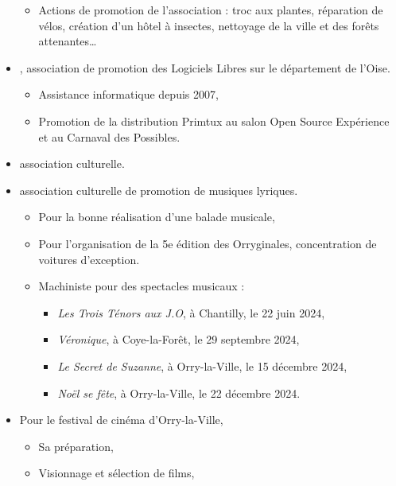 \begin{itemize}
\begin{itemize}
            \item{Actions de promotion de l'association : troc aux plantes, réparation de vélos, création d'un hôtel à insectes, nettoyage de la ville et des forêts attenantes\dots}
        \end{itemize}
    \item{, association de promotion des Logiciels Libres sur le département de l'Oise.}
        \begin{itemize}
            \item{Assistance informatique depuis 2007,}
            \item{Promotion de la distribution Primtux au salon Open Source Expérience et au Carnaval des Possibles.}
        \end{itemize}
    \item{ association culturelle.}
    \item{ association culturelle de promotion de musiques lyriques.}
        \begin{itemize}
            \item{Pour la bonne réalisation d'une balade musicale,}
            \item{Pour l'organisation de la 5e édition des Orryginales, concentration de voitures d'exception.}
            \item{Machiniste pour des spectacles musicaux :}
                \begin{itemize}
                    \item{\textit{Les Trois Ténors aux J.O}, à Chantilly, le 22 juin 2024,}
                    \item{\textit{Véronique}, à Coye-la-Forêt, le 29 septembre 2024,}
                    \item{\textit{Le Secret de Suzanne}, à Orry-la-Ville, le 15 décembre 2024,}
                    \item{\textit{Noël se fête}, à Orry-la-Ville, le 22 décembre 2024.}
                \end{itemize}
        \end{itemize}
    \item{Pour le festival de cinéma  d’Orry-la-Ville,}
        \begin{itemize}
            \item{Sa préparation,}
            \item{Visionnage et sélection de films,}

\end{itemize}
\end{itemize}
